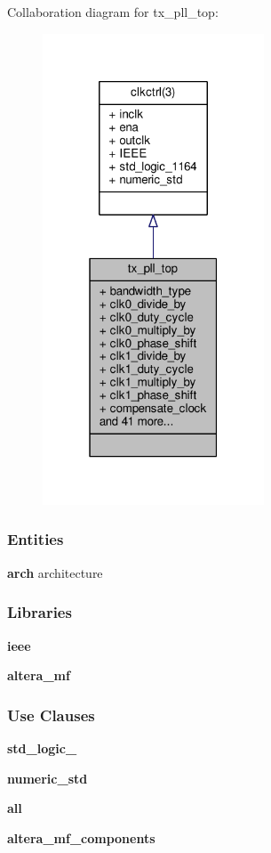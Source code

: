 Collaboration diagram for tx\+\_\+pll\+\_\+top\+:\nopagebreak
\begin{figure}[H]
\begin{center}
\leavevmode
\includegraphics[width=187pt]{da/dd1/classtx__pll__top__coll__graph}
\end{center}
\end{figure}
\subsubsection*{Entities}
\begin{DoxyCompactItemize}
\item 
{\bf arch} architecture
\end{DoxyCompactItemize}
\subsubsection*{Libraries}
 \begin{DoxyCompactItemize}
\item 
{\bf ieee} 
\item 
{\bf altera\+\_\+mf} 
\end{DoxyCompactItemize}
\subsubsection*{Use Clauses}
 \begin{DoxyCompactItemize}
\item 
{\bf std\+\_\+logic\+\_}   
\item 
{\bf numeric\+\_\+std}   
\item 
{\bf  all }   
\item 
{\bf altera\+\_\+mf\+\_\+components}   
\end{DoxyCompactItemize}
